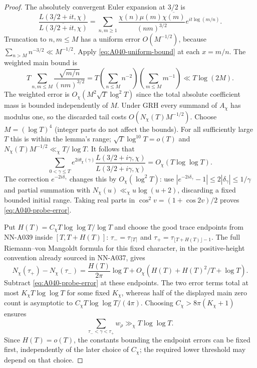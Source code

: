 \begin{proof}
The absolutely convergent Euler expansion at $3/2$ is
\[
 \frac{L(3/2+it,\chi)}{\overline{L(3/2+it,\chi)}}
   =\sum_{n,m\ge1}
    \frac{\chi(n)\mu(m)\overline{\chi(m)}}{(nm)^{3/2}}
                             e^{it\log(m/n)}.
\]
Truncation to $n,m\le M$ has a uniform error $O(M^{-1/2})$,
because $\sum_{n>M}n^{-3/2}\ll M^{-1/2}$.
Apply \eqref{eq:A040-uniform-bound} at each $x=m/n$.
The weighted main bound is
\[
 T\sum_{n,m\le M}\frac{\sqrt{m/n}}{(nm)^{3/2}}
     =T\left(\sum_{n\le M}n^{-2}\right)
         \left(\sum_{m\le M}m^{-1}\right)
     \ll T\log(2M).
\]
The weighted error is
$O_\chi(M^2\sqrt T\log^2T)$ since the total absolute
coefficient mass is bounded independently of $M$.
Under GRH every summand of $A_\chi$ has modulus one, so the
discarded tail costs $O(N_\chi(T)M^{-1/2})$.
Choose $M=(\log T)^4$ (integer parts do not affect the bounds).
For all sufficiently large $T$ this is within the lemma's range;
$\sqrt T\log^{10}T=o(T)$ and
$N_\chi(T)M^{-1/2}\ll_\chi T/\log T$. It follows that
\[
 \sum_{0<\gamma\le T}e^{2i\theta_\chi(\gamma)}
       \frac{L(3/2+i\gamma,\chi)}
            {\overline{L(3/2+i\gamma,\chi)}}
                            =O_\chi(T\log\log T).
\]
The correction $e^{-2i\delta_\gamma}$ changes this by
$O_\chi(\log^2T)$: use
$|e^{-2i\delta_\gamma}-1|\le2|\delta_\gamma|\le1/\gamma$
and partial summation with $N_\chi(u)\ll_\chi u\log(u+2)$,
discarding a fixed bounded initial range. Taking real parts in
$\cos^2v=(1+\cos2v)/2$ proves
\eqref{eq:A040-probe-error}.

Put $H(T)=C_\chi T\log\log T/\log T$ and choose the good
trace endpoints from NN-A039 inside $[T,T+H(T)]$:
$\tau_- =\tau_{\lceil T\rceil}$ and
$\tau_+ =\tau_{\lfloor T+H(T)\rfloor-1}$.
The full Riemann--von Mangoldt formula for this fixed character,
in the positive-height convention already sourced in NN-A037,
gives
\[
 N_\chi(\tau_+)-N_\chi(\tau_-)
          =\frac{H(T)}{2\pi}\log T
                       +O_\chi(H(T)+H(T)^2/T+\log T).
\]
Subtract \eqref{eq:A040-probe-error} at these endpoints.
The two error terms total at most $K_\chi T\log\log T$
for some fixed $K_\chi$, whereas half of the displayed main
zero count is asymptotic to
$C_\chi T\log\log T/(4\pi)$.
Choosing $C_\chi>8\pi(K_\chi+1)$ ensures
\begin{equation}\label{eq:A040-window-mass}
               \sum_{\tau_-<\gamma<\tau_+}w_\rho
                            \gg_\chi T\log\log T.
\end{equation}
Since $H(T)=o(T)$, the constants bounding the endpoint errors
can be fixed first, independently of the later choice of
$C_\chi$; the required lower threshold may depend on that choice.


\end{proof}
